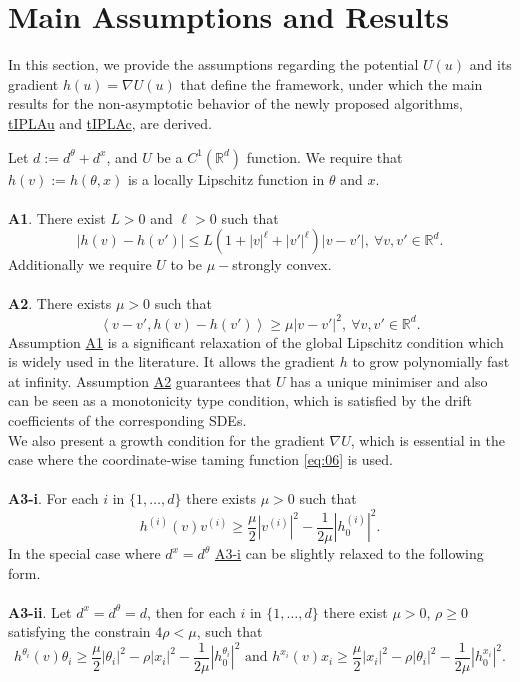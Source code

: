 \documentclass[a4paper, 10pt]{article}
\theoremstyle{plain}%
\begin{document}
\section{Main Assumptions and Results}
 In this section, we provide the assumptions regarding the potential $U(u)$ and its gradient  $h(u)=\nabla U(u)$ that define the framework, under which the main results for the non-asymptotic behavior of the newly proposed algorithms, \hyperref[algo1]{tIPLAu} and \hyperref[algo2]{tIPLAc}, are derived.
\par \noindent Let $d:=d^{\theta}+d^x$, and $U$ be a $C^1\left(\mathbb{R}^d\right)$ function. We require that $h(v):=h(\theta,x)$ is a locally Lipschitz function in $\theta$ and $x$.\\\hypertarget{Assum1}{} \\
\noindent \textbf{A1}. There exist $L>0$ and $\ell>0$ such that
$$|h(v)-h(v')|\leq L\left(1+|v|^{\ell}+|v'|^{\ell}\right)|v-v'|,\ \forall v,v'\in\mathbb{R}^d.$$
\noindent Additionally we require $U$ to be $\mu-$strongly convex.\\ \hypertarget{Assum2}{} \\
\noindent \textbf{A2}. There exists $\mu> 0$ such that
$$\left\langle v-v',h(v)-h(v')\right\rangle\geq \mu |v-v'|^2,\ \forall v,v'\in\mathbb{R}^d.$$
Assumption \hyperlink{Assum1}{A1} is a significant relaxation of the global Lipschitz condition which is widely used in the literature. It allows the gradient $h$ to grow polynomially fast at infinity. Assumption \hyperlink{Assum2}{A2} guarantees that $U$ has a unique minimiser and also can be seen as a monotonicity type condition, which is satisfied by the drift coefficients of the corresponding SDEs.\\
\indent We also present a growth condition for the gradient $\nabla U$, which is essential in the case where the coordinate-wise taming function \eqref{eq:06} is used.\\ \hypertarget{Assum3a}{}\\
\noindent \textbf{A3-i}. For each $i$ in $\{1,\ldots,d\}$ there exists $\mu>0$ such that $$h^{(i)}(v)v^{(i)}\geq \dfrac{\mu}{2} |v^{(i)}|^2-\dfrac{1}{2\mu}|h^{(i)}_0|^2.$$ In the special case where $d^x=d^\theta$ \hyperlink{Assum3a}{A3-i} can be slightly relaxed to the following form.\\\hypertarget{Assum3b}{}\\
\noindent \textbf{A3-ii}.
\noindent Let $d^x=d^{\theta}=d$, then for each $i$ in $\{1,\ldots,d\}$ there exist $\mu>0$, $\rho\geq 0$ satisfying the constrain $4\rho<\mu$, such that $$h^{{\theta}_i}(v){\theta}_i\geq \dfrac{\mu}{2} |{\theta}_i|^2-\rho|{x}_i|^2-\dfrac{1}{2\mu}|h^{\theta_i}_0|^2 \text{ and } h^{x_i}(v)x_i\geq \dfrac{\mu}{2} |x_i|^2-\rho|{\theta}_i|^2-\dfrac{1}{2\mu}|h^{x_i}_0|^2.$$
\end{document}
